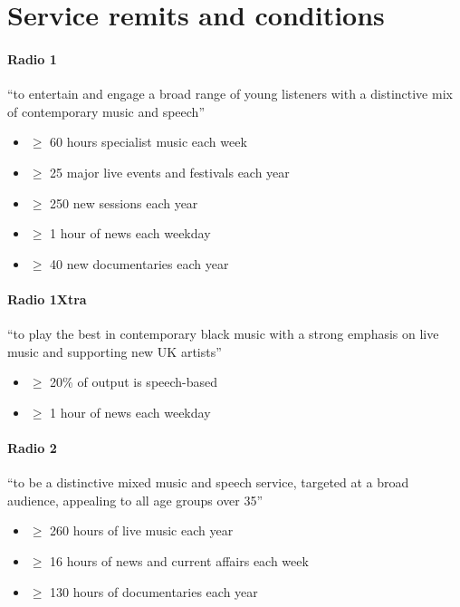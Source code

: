 \section{Service remits and conditions}\label{app:remit}

\paragraph{Radio 1}
``to entertain and engage a broad range of young listeners with a distinctive
mix of contemporary music and speech''

\begin{itemize}
  \item $\geq$ 60 hours specialist music each week
  \item $\geq$ 25 major live events and festivals each year
  \item $\geq$ 250 new sessions each year
  \item $\geq$ 1 hour of news each weekday
  \item $\geq$ 40 new documentaries each year
\end{itemize} 

\paragraph{Radio 1Xtra}
``to play the best in contemporary black music with a strong emphasis on live
music and supporting new UK artists''

\begin{itemize}
  \item $\geq$ 20\% of output is speech-based
  \item $\geq$ 1 hour of news each weekday
\end{itemize}

\paragraph{Radio 2}
``to be a distinctive mixed music and speech service, targeted at a broad
audience, appealing to all age groups over 35''

\begin{itemize}
  \item $\geq$ 260 hours of live music each year
  \item $\geq$ 16 hours of news and current affairs each week
  \item $\geq$ 130 hours of documentaries each year
\end{itemize}

